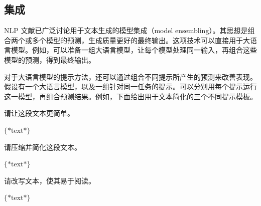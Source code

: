 \subsection{集成}

\noindent NLP 文献已广泛讨论用于文本生成的模型集成（model ensembling）。其思想是组合两个或多个模型的预测，生成质量更好的最终输出。这项技术可以直接用于大语言模型。例如，可以准备一组大语言模型，让每个模型处理同一输入，再组合这些模型的预测，得到最终输出。

对于大语言模型的提示方法，还可以通过组合不同提示所产生的预测来改善表现。假设有一个大语言模型，以及一组针对同一任务的提示。可以分别用每个提示运行这一模型，再组合预测结果。例如，下面给出用于文本简化的三个不同提示模板。

\vspace{0.5em}
\begin{tcolorbox}

\begingroup
\setlength{\leftskip}{2em}
\setlength{\rightskip}{2em}

请让这段文本更简单。

\vspace{0.2em}

$\{*\mathrm{text}*\}$

\underline{\hspace{2em}}

\endgroup

\end{tcolorbox}
\vspace{0.5em}

\vspace{0.5em}
\begin{tcolorbox}

\begingroup
\setlength{\leftskip}{2em}
\setlength{\rightskip}{2em}

请压缩并简化这段文本。

\vspace{0.2em}

$\{*\mathrm{text}*\}$

\underline{\hspace{2em}}

\endgroup

\end{tcolorbox}
\vspace{0.5em}

\vspace{0.5em}
\begin{tcolorbox}

\begingroup
\setlength{\leftskip}{2em}
\setlength{\rightskip}{2em}

请改写文本，使其易于阅读。

\vspace{0.2em}

$\{*\mathrm{text}*\}$

\underline{\hspace{2em}}

\endgroup

\end{tcolorbox}
\vspace{0.5em}

